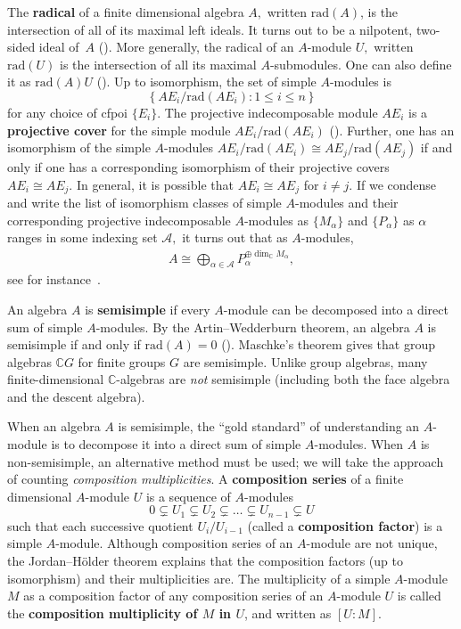 \documentclass[ALCO, Unicode]{cedram}
\def\rad{\mathrm{rad}}
\def\C{{\mathbb{C}}}
\begin{document}
The \textbf{radical} of a finite dimensional algebra $A,$ written \textbf{$\rad(A)$}, is the intersection of all of its maximal left ideals. It turns out to be a nilpotent, two-sided ideal of~$A$ (\cite[Corollary I.1.4, Corollary I.2.3]{assem}). More generally, the radical of an $A$-module $U,$ written \textbf{$\rad(U)$} is the intersection of all its maximal $A$-submodules. One can also define it as $\rad(A) U$ (\cite[Proposition I.3.7]{assem}). Up to isomorphism, the set of simple $A$-modules is $$\left\{AE_i / \rad(AE_i): 1 \leq i \leq n \right\}$$ for any choice of cfpoi $\{E_i\}.$ The projective indecomposable module $AE_i$ is a \textbf{projective cover} for the simple module $AE_i / \rad(A E_i)$ (\cite[Corollary I.5.9]{assem}). Further, one has an isomorphism of the simple $A$-modules $AE_i / \rad(A E_i) \cong A E_j / \rad(A E_j)$ if and only if one has a corresponding isomorphism of their projective covers $AE_i \cong AE_j.$ In general, it is possible that $AE_i \cong AE_j$ for $i \neq j$. If we condense and write the list of isomorphism classes of simple $A$-modules and their corresponding projective indecomposable $A$-modules as $\{M_\alpha\}$ and $\{P_\alpha\}$ as $\alpha$ ranges in some indexing set $\mathscr{A},$ it turns out that as $A$-modules,
 \begin{align} \label{eqn:algebra-decomposition}
     A \cong \bigoplus_{\alpha \in \mathscr{A}}P_\alpha^{\oplus \dim_\C M_\alpha},
 \end{align}
see for instance~\cite[Theorem 7.3.9]{webbrepntheory}.

 An algebra $A$ is \textbf{semisimple} if every $A$-module can be decomposed into a direct sum of simple $A$-modules. By the Artin--Wedderburn theorem, an algebra $A$ is semisimple if and only if $\rad(A) = 0$ (\cite[Theorem I.3.4]{assem}). Maschke's theorem gives that group algebras $\C G$ for finite groups $G$ are semisimple. Unlike group algebras, many finite-dimensional $\C$-algebras are \textit{not} semisimple (including both the face algebra and the descent algebra).

When an algebra $A$ is semisimple, the ``gold standard'' of understanding an $A$-module is to decompose it into a direct sum of simple $A$-modules. When $A$ is non-semisimple, an alternative method must be used; we will take the approach of counting \textit{composition multiplicities}. A \textbf{composition series} of a finite dimensional $A$-module $U$ is a sequence of $A$-modules $$0 \subsetneq U_1 \subsetneq U_2 \subsetneq \ldots \subsetneq U_{n - 1} \subsetneq U$$ such that each successive quotient $U_i / U_{i - 1}$ (called a \textbf{composition factor}) is a simple $A$-module. Although composition series of an $A$-module are not unique, the Jordan--H\"{o}lder theorem explains that the composition factors  (up to isomorphism) and their multiplicities are. The multiplicity of a simple $A$-module $M$ as a composition factor of any composition series of an $A$-module $U$ is called the \textbf{composition multiplicity of $M$ in $U$}, and written as \textbf{$[U: M].$} 
 
\end{document}
